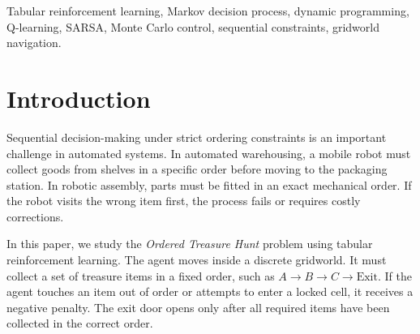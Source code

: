 \documentclass[10pt,conference]{IEEEtran}
\begin{document}
\begin{abstract}
In sequential decision-making, an agent must often visit key locations in an exact order before reaching an exit. In this work, we study the Ordered Treasure Hunt problem using tabular reinforcement learning. The agent navigates a gridworld to collect target items in a prescribed sequence. Picking items out of order causes a penalty, and entering the exit door too early is heavily penalized. We design an augmented state vector $s = (r, c, p, w, tok)$ that combines spatial coordinates, task collection progress, a switch flag, and a skip-token flag. We prove mathematically and demonstrate experimentally that tracking task progress inside the state is required to preserve the Markov property. We benchmark five tabular algorithms: Value Iteration, Policy Iteration, Q-Learning, SARSA, and Monte Carlo Control across three square maps ($5\times 5$, $7\times 7$, and $8\times 8$). Across 200 greedy test rollouts, all five algorithms achieve a 100\% mission completion rate. Model-free TD methods find the exact optimal paths discovered by dynamic programming on Level 1 (12 steps) and Level 2 (11 steps). On the hard $8\times 8$ map, we analyze how a bonus shortcut tile creates a local optimum. We also test three step penalty values ($-0.2$, $-1.0$, and $-5.0$), showing how step costs change the optimal collection policy.
\end{abstract}

\begin{IEEEkeywords}
Tabular reinforcement learning, Markov decision process, dynamic programming, Q-learning, SARSA, Monte Carlo control, sequential constraints, gridworld navigation.
\end{IEEEkeywords}

\section{Introduction}
Sequential decision-making under strict ordering constraints is an important challenge in automated systems. In automated warehousing, a mobile robot must collect goods from shelves in a specific order before moving to the packaging station. In robotic assembly, parts must be fitted in an exact mechanical order. If the robot visits the wrong item first, the process fails or requires costly corrections.

In this paper, we study the \textit{Ordered Treasure Hunt} problem using tabular reinforcement learning. The agent moves inside a discrete gridworld. It must collect a set of treasure items in a fixed order, such as $A \rightarrow B \rightarrow C \rightarrow \text{Exit}$. If the agent touches an item out of order or attempts to enter a locked cell, it receives a negative penalty. The exit door opens only after all required items have been collected in the correct order.
\end{document}
